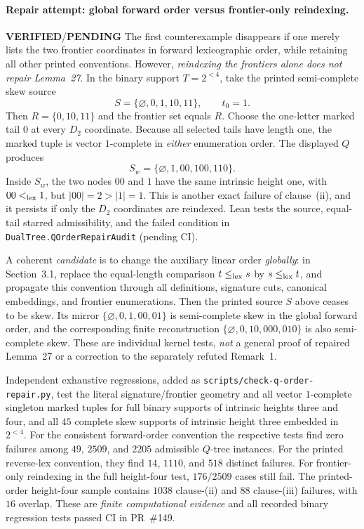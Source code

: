 \documentclass[11pt]{article}
\newcommand{\ok}{\textcolor{green!40!black}{\textbf{VERIFIED}}}
\newcommand{\todo}{\textcolor{gray!70!black}{\textbf{PENDING}}}
\newcommand{\lean}[1]{\texttt{#1}}
\begin{document}
\paragraph{Repair attempt: global forward order versus frontier-only reindexing.} \ok/\todo
The first counterexample disappears if one merely lists the
two frontier coordinates in forward lexicographic order,
while retaining all other printed conventions.
However, \emph{reindexing the frontiers alone does not repair
Lemma~27}. In the binary support $T=2^{<4}$, take the
printed semi-complete skew source
\[
 S=\{\varnothing,0,1,10,11\},\qquad t_0=1.
\]
Then $R=\{0,10,11\}$ and the frontier set equals $R$.
Choose the one-letter marked tail $0$ at every $D_2$
coordinate. Because all selected tails have length one,
the marked tuple is vector $1$-complete in \emph{either}
enumeration order. The displayed $Q$ produces
\[
 S_w=\{\varnothing,1,00,100,110\}.
\]
Inside $S_w$, the two nodes $00$ and $1$ have the same
intrinsic height one, with $00<_{\rm lex}1$, but
$|00|=2>|1|=1$. This is another exact failure of clause~(ii),
and it persists if only the $D_2$ coordinates are reindexed.
Lean tests the source, equal-tail starred admissibility,
and the failed condition in
\lean{DualTree.QOrderRepairAudit} (pending CI).

A coherent \emph{candidate} is to change the
auxiliary linear order \emph{globally}: in Section~3.1,
replace the equal-length comparison
$t\le_{\rm lex}s$ by $s\le_{\rm lex}t$,
and propagate this convention through all definitions,
signature cuts, canonical embeddings, and frontier
enumerations. Then the printed source $S$ above ceases
to be skew. Its mirror
$\{\varnothing,0,1,00,01\}$ is semi-complete skew in
the global forward order, and the corresponding finite
reconstruction
$\{\varnothing,0,10,000,010\}$ is also semi-complete
skew. These are individual kernel tests, \emph{not}
a general proof of repaired Lemma~27 or a correction
to the separately refuted Remark~1.

Independent exhaustive regressions, added as
\texttt{scripts/check-q-order-repair.py}, test
the literal signature/frontier geometry and all
vector $1$-complete singleton marked tuples for
full binary supports of intrinsic heights three
and four, and all $45$ complete skew supports of
intrinsic height three embedded in $2^{<4}$.
For the consistent forward-order convention the
respective tests find zero failures among $49$,
$2509$, and $2205$ admissible $Q$-tree instances.
For the printed reverse-lex convention, they find
$14$, $1110$, and $518$ distinct failures.
For frontier-only reindexing in the full height-four
test, $176/2509$ cases still fail.
The printed-order height-four sample contains $1038$
clause-(ii) and $88$ clause-(iii) failures, with $16$
overlap. These are \emph{finite computational evidence}
and all recorded binary regression tests passed CI in PR~\#149.
\end{document}
